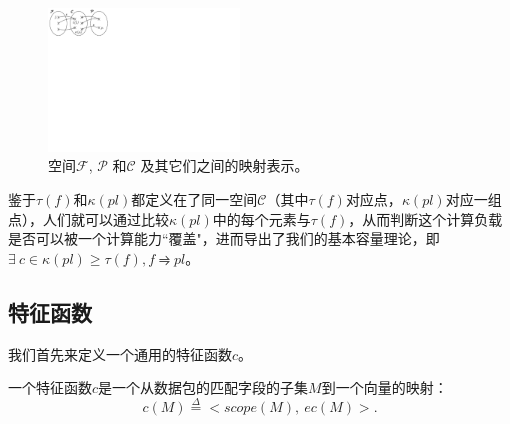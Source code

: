 
\begin{figure}[tbh]
    \centering
    \vspace{-1mm}
    \includegraphics[clip, trim=0in 8.5in 9.8in 0in, width=2in]{figures/function-spaces.pdf}
    \vspace{-2mm}
    \caption{空间$\mathcal{F}$, $\mathcal{P}$ 和$\mathcal{C}$ 及其它们之间的映射表示。}
    \label{cap:fig:function-spaces}
    \vspace{-2mm}
\end{figure}

鉴于$\tau(f)$和$\kappa(pl)$都定义在了同一空间$\mathcal{C}$（其中$\tau(f)$对应点，$\kappa(pl)$对应一组点），人们就可以通过比较$\kappa(pl)$中的每个元素与$\tau(f)$，从而判断这个计算负载是否可以被一个计算能力``覆盖"，进而导出了我们的基本容量理论，即$\exists\ c \in \kappa(pl) \geq \tau(f), f \rightrightharpoons pl$。


\subsection{特征函数}


我们首先来定义一个通用的特征函数$c$。
\begin{definition} 一个特征函数$c$是一个从数据包的匹配字段的子集$M$到一个向量的映射：  
\begin{equation*}
c(M) \overset{\Delta}{=} <scope(M),\ ec(M)>.
\end{equation*}
\end{definition}

